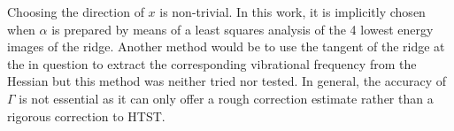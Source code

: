 Choosing the direction of $x$ is non-trivial.
In this work, it is implicitly chosen when $\alpha$ is prepared by means of a least squares analysis of the 4 lowest energy images of the ridge.
Another method would be to use the tangent of the ridge at the  in question to extract the corresponding vibrational frequency from the Hessian but this method was neither tried nor tested.
In general, the accuracy of $\Gamma$ is not essential as it can only offer a rough correction estimate rather than a rigorous correction to HTST.
